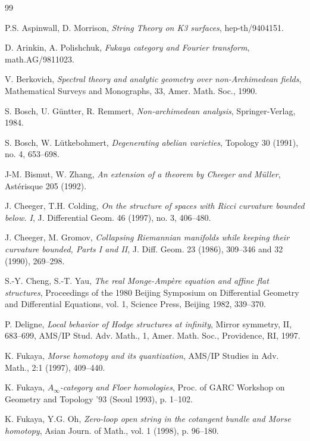 \begin{thebibliography}{99}
\setlength{\itemsep}{1pt}

 P.S. Aspinwall, D. Morrison, \textit{String Theory on K3 surfaces}, hep-th/9404151.

 D. Arinkin, A. Polishchuk, \textit{Fukaya category and Fourier transform}, math.AG/9811023.

 V. Berkovich, \textit{Spectral theory and analytic geometry over non-Archimedean fields}, Mathematical Surveys and Monographs, 33, Amer. Math. Soc., 1990.

 S. Bosch, U. Güntter, R. Remmert, \textit{Non-archimedean analysis}, Springer-Verlag, 1984.

 S. Bosch, W. Lütkebohmert, \textit{Degenerating abelian varieties}, Topology 30 (1991), no. 4, 653--698.

 J-M. Bismut, W. Zhang, \textit{An extension of a theorem by Cheeger and Müller}, Astérisque 205 (1992).

 J. Cheeger, T.H. Colding, \textit{On the structure of spaces with Ricci curvature bounded below. I}, J. Differential Geom. 46 (1997), no. 3, 406--480.

 J. Cheeger, M. Gromov, \textit{Collapsing Riemannian manifolds while keeping their curvature bounded, Parts I and II}, J. Diff. Geom. 23 (1986), 309--346 and 32 (1990), 269--298.

 S.-Y. Cheng, S.-T. Yau, \textit{The real Monge-Ampère equation and affine flat structures}, Proceedings of the 1980 Beijing Symposium on Differential Geometry and Differential Equations, vol. 1, Science Press, Beijing 1982, 339--370.

 P. Deligne, \textit{Local behavior of Hodge structures at infinity}, Mirror symmetry, II, 683--699, AMS/IP Stud. Adv. Math., 1, Amer. Math. Soc., Providence, RI, 1997.

 K. Fukaya, \textit{Morse homotopy and its quantization}, AMS/IP Studies in Adv. Math., 2:1 (1997), 409--440.

 K. Fukaya, \textit{$A_\infty$-category and Floer homologies}, Proc. of GARC Workshop on Geometry and Topology '93 (Seoul 1993), p. 1--102.

 K. Fukaya, Y.G. Oh, \textit{Zero-loop open string in the cotangent bundle and Morse homotopy}, Asian Journ. of Math., vol. 1 (1998), p. 96--180.


\end{thebibliography}
